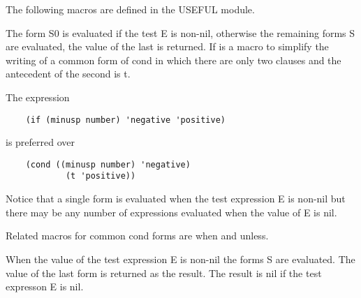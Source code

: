  The following macros are defined in the USEFUL module.


{    The form S0 is evaluated if the test E is non-nil, otherwise
    the  remaining  forms S are evaluated, the value of the last
    is returned.  If is a macro to simplify  the  writing  of  a
    common  form of cond in which there are only two clauses and
    the antecedent of the second is t.}

The expression
\begin{verbatim}
    (if (minusp number) 'negative 'positive)
\end{verbatim}
    is preferred over
\begin{verbatim}
    (cond ((minusp number) 'negative)
            (t 'positive))
\end{verbatim}
    Notice that  a  single  form  is  evaluated  when  the  test
    expression  E  is  non-nil  but  there  may be any number of
    expressions evaluated when the value of E is nil.

  Related macros for common cond forms are when and unless.


{    When the value of the test expression E is non-nil the forms
    S are evaluated.  The value of the last form is returned  as
    the  result.    The result is nil if the test expresson E is
    nil.}

